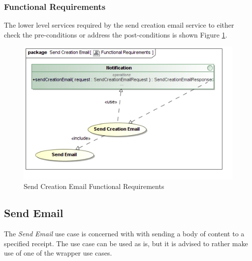 \subsubsection{Functional Requirements}
The lower level services required by the send creation email service to either
check the pre-conditions or address the post-conditions is shown 
Figure \ref{fig:sendCreationEmailFunctionalRequirements}.
\begin{figure}[H]
	\begin{center}
		\includegraphics[scale=0.38]{../Diagrams and Charts/Notifications/Send Creation Email Functional Requirements.jpg}
		\caption{Send Creation Email Functional Requirements}
	  \label{fig:sendCreationEmailFunctionalRequirements}
	\end{center}
\end{figure}



\subsection{Send Email}
The \textit{Send Email} use case is concerned with with sending a body of
content to a specified receipt. The use case can be used as is, but it is
advised to rather make use of one of the wrapper use cases.

